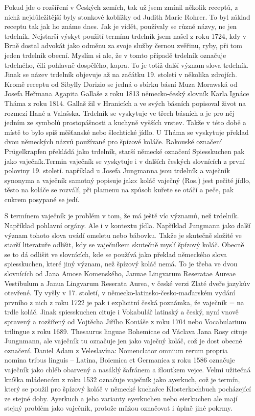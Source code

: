 Pokud jde o rozšíření v Českých zemích, tak už jsem zmínil několik receptů, z nichž nejdůležitější byly stonkové koblížky od Judith Marie Rohrer. To byl základ receptu tak jak ho známe dnes. Jak je vidět, používaly se různé názvy, ne jen trdelník. Nejstarší výskyt použití termínu trdelník jsem našel z roku 1724, kdy v Brně dostal advokát jako odměnu za svoje služby černou zvěřinu, ryby, při tom jeden trdelník obecní. Myslím si ale, že v tomto případě trdelník označuje trdelného, čili pohlavně dospělého, kapra. To je totiž další význam slova trdelník. Jinak se název trdelník objevuje až na začátku 19. století v několika zdrojích. Kromě receptu od Sibylly Dorizio se jedná o sbírku básní Muza Morawská od Josefa Heřmana Agapita Gallaše z roku 1813 německo-český slovník Karla Ignáce Tháma z roku 1814. Gallaš žil v Hranicích a ve svých básních popisoval život na rozmezí Hané a Valašska. Trdelník se vyskytuje ve třech básních a je pro něj jedním ze symbolů prostopášnosti a kuchyně vyšších vrstev. Takže v této době a místě to bylo spíš měšťanské nebo šlechtické jídlo. U Tháma se vyskytuje překlad dvou německých názvů používané pro špízové koláče. Rakouské označení Prügelkrapfen překládá jako trdelník, starší německé označení Spiesskuchen pak jako vaječník.Termin vaječník se vyskytuje i v dalších českých slovnících z první poloviny 19. století. například u Josefa Jungmanna jsou trdelník a vaječník synonyma a vaječník samotný popisuje jako: koláč vaječný (Ros.) jest pečité jídlo, těsto na koláče se rozválí, při plamenu na způsob kuřete se otáčí a peče, pak cukrem posypané se jedí. 

S termínem vaječník je problém v tom, že má ještě víc významů, než trdelník. Například pohlavní orgány. Ale i v kontextu jídla. Například Jungmann jako další význam tohoto slova uvádí omeletu nebo bábovku. Takže je skutečně složité ve starší literatuře odlišit, kdy se vaječníkem skutečně myslí špízový koláč. Obecně se to dá odlišit ve slovnících, kde se používá jako překlad německého slova spiesskuchen, které jiný význam, než špízový koláč nemá. To je třeba ve dvou slovnících od Jana Amose Komenského, Januae Lingvarum Reseratae Aureae Vestibulum a Janua Lingvarum Reserata Aurea, v české verzi Zlaté dveře jazykův otevřené. Ty vyšly v 17. století, v německo-latinsko-česko-maďarském vydání  prvního z nich  z roku 1722 je pak i explicitní česká poznámka, že vaječník = na trdle koláč. Jinak spiesskuchen cituje i Vokabulář latinský a český, nyní vnově spravený a rozšiřený od Vojtěcha Jiřího Koniáše z roku 1704 nebo  Vocabularium trilingue z roku 1689. Thesaurus linguae Bohemicae od  Václava Jana Rosy cituje Jungnmann, ale vaječník tu označuje jen jako vaječný koláč, což je dost obecné označení. Daniel Adam z Veleslavína: Nomenclator omnium rerum propria nomina tribus linguis – Latina, Boiemica et Germanica z roku 1586 označuje vaječník jako chléb obarvený a nasáklý šafránem a žloutkem vejce. Velmi užitečná kníška mládencóm z roku 1532 označuje vaječník jako ayerkuch, což je termín, který se použil pro špízový koláč v německé kuchařce Klosterkochbuch pocházející ze stejné doby. Ayerkuch a jeho varianty eyerkuchen nebo eierkuchen ale mají stejný problém jako vaječník, protože můžou označovat i úplně jiné pokrmy.  

